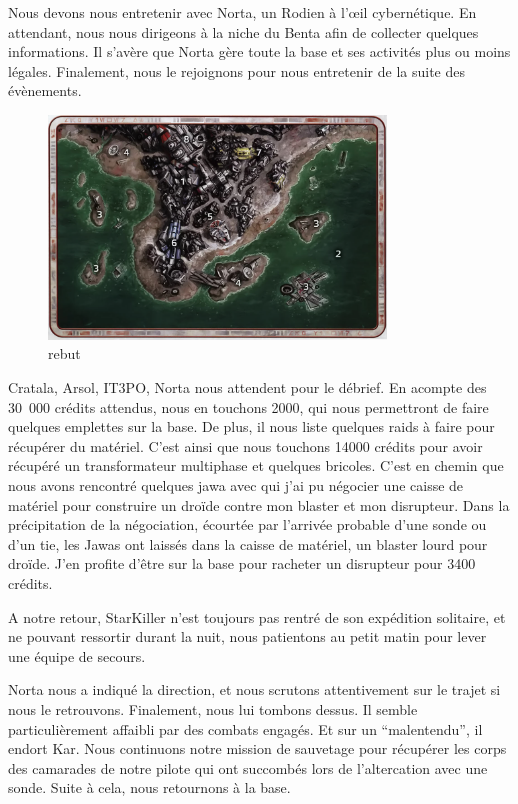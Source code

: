 \documentclass[a4paper,9pt,twoside,twocolumn,openany]{book}
\begin{document}
Nous devons nous entretenir avec Norta, un Rodien à l’œil cybernétique. En attendant, nous nous dirigeons à la niche du Benta afin de collecter quelques informations. Il s’avère que Norta gère toute la base et ses activités plus ou moins légales. Finalement, nous le rejoignons pour nous entretenir de la suite des évènements.

\begin{figure}
\centering
    \includegraphics[width=0.80\textwidth]{img/rebut.png}
    \caption{rebut}
\end{figure}

Cratala, Arsol, IT3PO, Norta nous attendent pour le débrief. En acompte des 30\ 000 crédits attendus, nous en touchons 2000, qui nous permettront de faire quelques emplettes sur la base. De plus, il nous liste quelques raids à faire pour récupérer du matériel. C’est ainsi que nous touchons 14000 crédits pour avoir récupéré un transformateur multiphase et quelques bricoles. C’est en chemin que nous avons rencontré quelques jawa avec qui j’ai pu négocier une caisse de matériel pour construire un droïde contre mon blaster et mon disrupteur. Dans la précipitation de la négociation, écourtée par l’arrivée probable d’une sonde ou d’un tie, les Jawas ont laissés dans la caisse de matériel, un blaster lourd pour droïde. J’en profite d’être sur la base pour racheter un disrupteur pour 3400 crédits.

A notre retour, StarKiller n’est toujours pas rentré de son expédition solitaire, et ne pouvant ressortir durant la nuit, nous patientons au petit matin pour lever une équipe de secours.

Norta nous a indiqué la direction, et nous scrutons attentivement sur le trajet si nous le retrouvons. Finalement, nous lui tombons dessus. Il semble particulièrement affaibli par des combats engagés. Et sur un “malentendu”, il endort Kar. Nous continuons notre mission de sauvetage pour récupérer les corps des camarades de notre pilote qui ont succombés lors de l’altercation avec une sonde. Suite à cela, nous retournons à la base.
\end{document}
